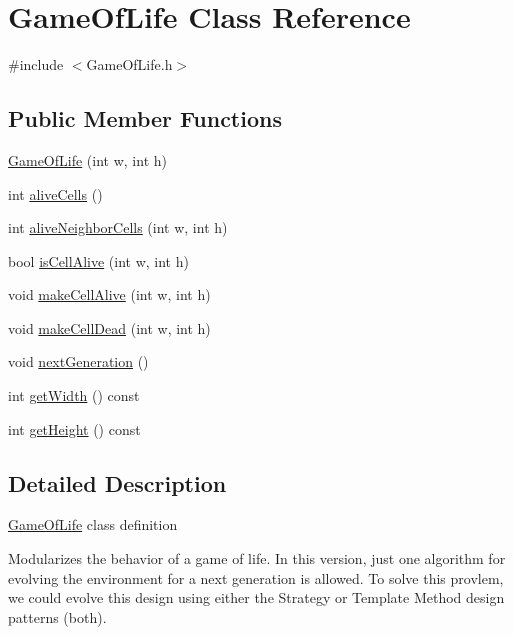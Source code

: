 \hypertarget{class_game_of_life}{
\section{GameOfLife Class Reference}
\label{class_game_of_life}
}


{\ttfamily \#include $<$GameOfLife.h$>$}

\subsection*{Public Member Functions}
\begin{DoxyCompactItemize}
\item 
\hyperlink{class_game_of_life_a75b95639a474f4b263363047307d753b}{GameOfLife} (int w, int h)
\item 
int \hyperlink{class_game_of_life_a1c740d5f412f4205c13e7ddb31a3bf74}{aliveCells} ()
\item 
int \hyperlink{class_game_of_life_a8e378880adb2a5ebfa1675d3cd516791}{aliveNeighborCells} (int w, int h)
\item 
bool \hyperlink{class_game_of_life_a7fc23cd47d2f304195366397bdef6631}{isCellAlive} (int w, int h)
\item 
void \hyperlink{class_game_of_life_a8a1d68a881a0e4ea914dcac7c105bcb1}{makeCellAlive} (int w, int h)
\item 
void \hyperlink{class_game_of_life_abe77740fa4db92cbab1c67fad160fff0}{makeCellDead} (int w, int h)
\item 
void \hyperlink{class_game_of_life_a7a08a682e13b4b695637749dc56c2cd8}{nextGeneration} ()
\item 
int \hyperlink{class_game_of_life_a097230470ccc7de6095744b479b8d842}{getWidth} () const 
\item 
int \hyperlink{class_game_of_life_aa05c6988166fd5ba9289bb9581479312}{getHeight} () const 
\end{DoxyCompactItemize}


\subsection{Detailed Description}
\hyperlink{class_game_of_life}{GameOfLife} class definition

Modularizes the behavior of a game of life. In this version, just one algorithm for evolving the environment for a next generation is allowed. To solve this provlem, we could evolve this design using either the Strategy or Template Method design patterns (both).

